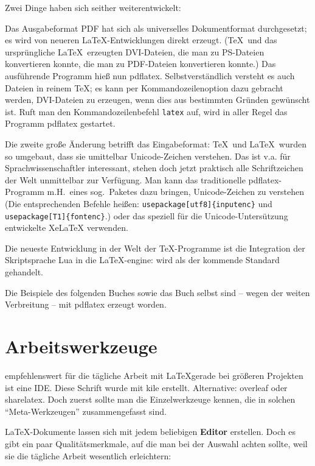 \documentclass[draft=false,11pt,DIV=8]{scrbook}  	%
\begin{document}
Zwei Dinge haben sich seither weiterentwickelt:

Das Ausgabeformat PDF hat sich als universelles Dokumentformat durchgesetzt; es wird von neueren
\LaTeX -Entwicklungen direkt erzeugt. (\TeX\ und das ursprüngliche \LaTeX\ erzeugten DVI-Dateien,
die man zu PS-Dateien konvertieren konnte, die man zu PDF-Dateien konvertieren konnte.)
Das ausführende Programm hieß nun pdflatex. 
Selbstverständlich versteht es auch Dateien in reinem \TeX ;
es kann per Kommandozeilenoption dazu gebracht werden, DVI-Dateien zu erzeugen, wenn dies aus 
bestimmten Gründen gewünscht ist.
Ruft man den Kommandozeilenbefehl \lstinline/latex/ auf, wird in aller Regel das Programm 
pdflatex gestartet.

Die zweite große Änderung betrifft das Eingabeformat:
\TeX\ und \LaTeX\ wurden so umgebaut, dass sie umittelbar Unicode-Zeichen verstehen.
Das ist v.a. für Sprachwissenschaftler interessant, stehen doch jetzt praktisch alle Schriftzeichen
der Welt unmittelbar zur Verfügung. 
Man kann das traditionelle pdflatex-Programm m.H.\ eines sog.\ Paketes dazu bringen, Unicode-Zeichen
zu verstehen
(Die entsprechenden Befehle heißen: \lstinline/usepackage[utf8]{inputenc}/ 
und \lstinline/usepackage[T1]{fontenc}/.)
oder das speziell für die Unicode-Untersützung entwickelte XeLaTeX verwenden.

Die neueste Entwicklung in der Welt der \TeX -Programme ist die Integration der Skriptsprache
Lua in die \LaTeX -engine:  wird als der kommende Standard gehandelt.

Die Beispiele des folgenden Buches sowie das Buch selbst sind -- wegen der weiten Verbreitung --
mit pdflatex erzeugt worden.

\section{Arbeitswerkzeuge}

empfehlenswert für die tägliche Arbeit mit \LaTeX gerade bei größeren Projekten ist eine IDE.
Diese Schrift wurde mit kile erstellt.
Alternative: overleaf oder sharelatex.
Doch zuerst sollte man die Einzelwerkzeuge kennen, die in solchen \enquote{Meta-Werkzeugen}
zusammengefasst sind.


\LaTeX -Dokumente lassen sich mit jedem beliebigen \textbf{Editor} erstellen.
Doch es gibt ein paar Qualitätsmerkmale, auf die man bei der Auswahl achten sollte, weil
sie die tägliche Arbeit wesentlich erleichtern:
\end{document}
